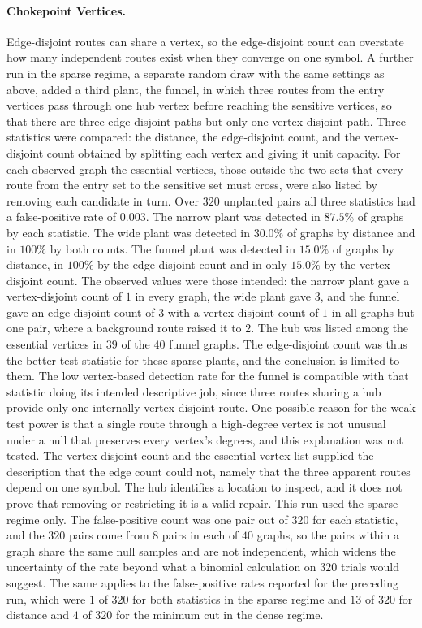 \documentclass[11pt]{article}
\begin{document}
\paragraph{Chokepoint Vertices.} Edge-disjoint routes can share a vertex, so the edge-disjoint count can overstate how many independent routes exist when they converge on one symbol. A further run in the sparse regime, a separate random draw with the same settings as above, added a third plant, the funnel, in which three routes from the entry vertices pass through one hub vertex before reaching the sensitive vertices, so that there are three edge-disjoint paths but only one vertex-disjoint path. Three statistics were compared: the distance, the edge-disjoint count, and the vertex-disjoint count obtained by splitting each vertex and giving it unit capacity. For each observed graph the essential vertices, those outside the two sets that every route from the entry set to the sensitive set must cross, were also listed by removing each candidate in turn. Over $320$ unplanted pairs all three statistics had a false-positive rate of $0.003$. The narrow plant was detected in $87.5\%$ of graphs by each statistic. The wide plant was detected in $30.0\%$ of graphs by distance and in $100\%$ by both counts. The funnel plant was detected in $15.0\%$ of graphs by distance, in $100\%$ by the edge-disjoint count and in only $15.0\%$ by the vertex-disjoint count. The observed values were those intended: the narrow plant gave a vertex-disjoint count of $1$ in every graph, the wide plant gave $3$, and the funnel gave an edge-disjoint count of $3$ with a vertex-disjoint count of $1$ in all graphs but one pair, where a background route raised it to $2$. The hub was listed among the essential vertices in $39$ of the $40$ funnel graphs. The edge-disjoint count was thus the better test statistic for these sparse plants, and the conclusion is limited to them. The low vertex-based detection rate for the funnel is compatible with that statistic doing its intended descriptive job, since three routes sharing a hub provide only one internally vertex-disjoint route. One possible reason for the weak test power is that a single route through a high-degree vertex is not unusual under a null that preserves every vertex's degrees, and this explanation was not tested. The vertex-disjoint count and the essential-vertex list supplied the description that the edge count could not, namely that the three apparent routes depend on one symbol. The hub identifies a location to inspect, and it does not prove that removing or restricting it is a valid repair. This run used the sparse regime only. The false-positive count was one pair out of $320$ for each statistic, and the $320$ pairs come from $8$ pairs in each of $40$ graphs, so the pairs within a graph share the same null samples and are not independent, which widens the uncertainty of the rate beyond what a binomial calculation on $320$ trials would suggest. The same applies to the false-positive rates reported for the preceding run, which were $1$ of $320$ for both statistics in the sparse regime and $13$ of $320$ for distance and $4$ of $320$ for the minimum cut in the dense regime.
\end{document}
